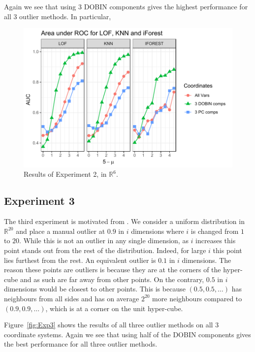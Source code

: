 \documentclass[11pt]{article}
\begin{document}
Again we see that using 3 DOBIN components gives the highest performance for all 3 outlier methods. In particular, 
\begin{figure}[!t]
	\centering
	\includegraphics[scale=0.8]{Exp2.pdf}
	\caption{Results of Experiment 2, in $\mathbb{R}^6$.}
	\label{fig:Exp2}
\end{figure} 

\subsection{Experiment 3}
The third experiment is motivated from \cite{zimek2012survey}. We consider a uniform distribution in $\mathbb{R}^{20}$ and place a manual outlier at $0.9$ in $i$ dimensions where $i$ is changed from $1$ to $20$. While this is not an outlier in any single dimension, as $i$ increases this point stands out from the rest of the distribution. Indeed, for large $i$ this  point lies furthest from the rest. An equivalent outlier is $0.1$ in $i$ dimensions. The reason these points are outliers is because they are at the corners of the hyper-cube and as such are far away from other points. On the contrary, $0.5$ in $i$ dimensions would be closest to other points. This is because $(0.5, 0.5, \ldots)$ has neighbours from all sides and has on average $2^{20}$ more neighbours compared to $(0.9, 0.9, \ldots)$, which is at a corner on the unit hyper-cube.  

Figure~\ref{fig:Exp3} shows the results of all three outlier methods on all $3$ coordinate systems. Again we see that using half of the DOBIN components gives the best performance for all three outlier methods.    \\
\end{document}
